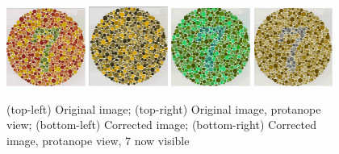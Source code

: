 \documentclass[10pt,twocolumn,letterpaper]{article}
\begin{document}
\begin{figure}[h]
  \includegraphics[width=0.23\textwidth]{isihara1.png}
 \includegraphics[width=0.23\textwidth]{isihara2.png}
\includegraphics[width=0.23\textwidth]{isihara3.png}
  \includegraphics[width=0.23\textwidth]{isihara4.png}
  \caption{(top-left) Original image; (top-right) Original image, protanope view; (bottom-left) Corrected image; (bottom-right) Corrected image, protanope view, 7 now visible}
  \label{fig:isihara}
\end{figure}
\end{document}
